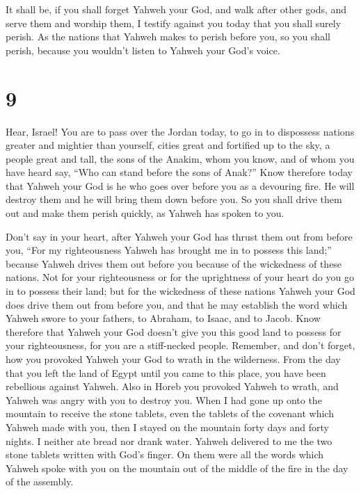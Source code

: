 It shall be, if you shall forget Yahweh your God, and
walk after other gods, and serve them and worship them, I testify
against you today that you shall surely perish.  As the
nations that Yahweh makes to perish before you, so you shall perish,
because you wouldn't listen to Yahweh your God's voice.

\hypertarget{section-8}{%
\section{9}\label{section-8}}

 Hear, Israel! You are to pass over the Jordan today, to
go in to dispossess nations greater and mightier than yourself, cities
great and fortified up to the sky,  a people great and
tall, the sons of the Anakim, whom you know, and of whom you have heard
say, ``Who can stand before the sons of Anak?''  Know
therefore today that Yahweh your God is he who goes over before you as a
devouring fire. He will destroy them and he will bring them down before
you. So you shall drive them out and make them perish quickly, as Yahweh
has spoken to you.

 Don't say in your heart, after Yahweh your God has thrust
them out from before you, ``For my righteousness Yahweh has brought me
in to possess this land;'' because Yahweh drives them out before you
because of the wickedness of these nations.  Not for your
righteousness or for the uprightness of your heart do you go in to
possess their land; but for the wickedness of these nations Yahweh your
God does drive them out from before you, and that he may establish the
word which Yahweh swore to your fathers, to Abraham, to Isaac, and to
Jacob.  Know therefore that Yahweh your God doesn't give
you this good land to possess for your righteousness, for you are a
stiff-necked people.  Remember, and don't forget, how you
provoked Yahweh your God to wrath in the wilderness. From the day that
you left the land of Egypt until you came to this place, you have been
rebellious against Yahweh.  Also in Horeb you provoked
Yahweh to wrath, and Yahweh was angry with you to destroy you.
 When I had gone up onto the mountain to receive the stone
tablets, even the tablets of the covenant which Yahweh made with you,
then I stayed on the mountain forty days and forty nights. I neither ate
bread nor drank water.  Yahweh delivered to me the two
stone tablets written with God's finger. On them were all the words
which Yahweh spoke with you on the mountain out of the middle of the
fire in the day of the assembly.

